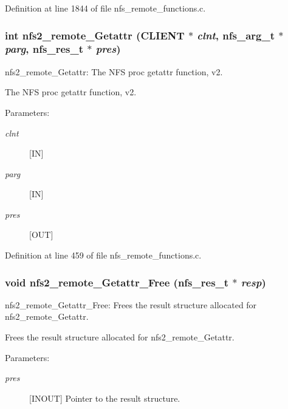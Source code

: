 Definition at line 1844 of file nfs\_\-remote\_\-functions.c.
\subsubsection[{nfs2\_\-remote\_\-Getattr}]{\setlength{\rightskip}{0pt plus 5cm}int nfs2\_\-remote\_\-Getattr (CLIENT $\ast$ {\em clnt}, \/  nfs\_\-arg\_\-t $\ast$ {\em parg}, \/  nfs\_\-res\_\-t $\ast$ {\em pres})}\label{group__NFSprocs_g50863b383bcaca2d6f036e19f45a272a}


nfs2\_\-remote\_\-Getattr: The NFS proc getattr function, v2.

The NFS proc getattr function, v2.

\begin{Desc}
\item[Parameters:]
\begin{description}
\item[{\em clnt}][IN] \item[{\em parg}][IN] \item[{\em pres}][OUT] \end{description}
\end{Desc}


Definition at line 459 of file nfs\_\-remote\_\-functions.c.
\subsubsection[{nfs2\_\-remote\_\-Getattr\_\-Free}]{\setlength{\rightskip}{0pt plus 5cm}void nfs2\_\-remote\_\-Getattr\_\-Free (nfs\_\-res\_\-t $\ast$ {\em resp})}\label{group__NFSprocs_gaa5cabdd9a1a35185a2cd1e1e21bf177}


nfs2\_\-remote\_\-Getattr\_\-Free: Frees the result structure allocated for nfs2\_\-remote\_\-Getattr.

Frees the result structure allocated for nfs2\_\-remote\_\-Getattr.

\begin{Desc}
\item[Parameters:]
\begin{description}
\item[{\em pres}][INOUT] Pointer to the result structure. \end{description}
\end{Desc}


